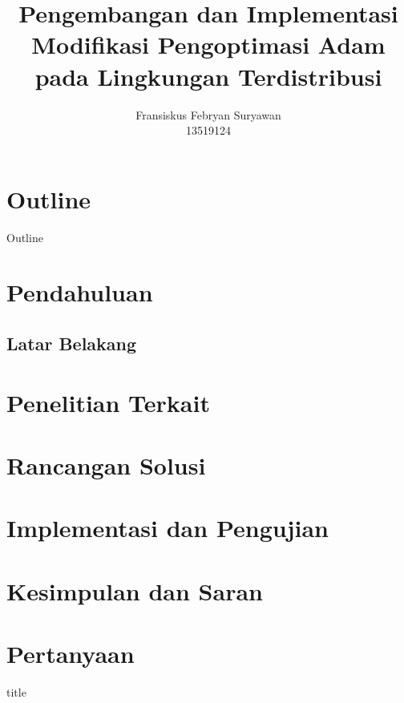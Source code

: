 \documentclass[aspectratio=169]{beamer}
\title[Modifikasi Adam]{Pengembangan dan Implementasi Modifikasi Pengoptimasi Adam pada Lingkungan Terdistribusi}
\author[]{
  Fransiskus Febryan Suryawan\\
  13519124
}
\institute{Institut Teknologi Bandung}
\date{}
\begin{document}


\section*{Outline}
\begin{frame}{Outline}
  \begin{center}
    \begin{multicols}{2}
      \tableofcontents
    \end{multicols}
  \end{center}
\end{frame}

\section{Pendahuluan}
\subsection{Latar Belakang}





\section{Penelitian Terkait}



\section{Rancangan Solusi}


\section{Implementasi dan Pengujian}







\section{Kesimpulan dan Saran}



\section*{Pertanyaan}
\begin{frame}
  \vfill
  \centering
  \begin{beamercolorbox}[sep=8pt,center]{title}
    \insertsectionhead\par
  \end{beamercolorbox}
\end{frame}
\end{document}
